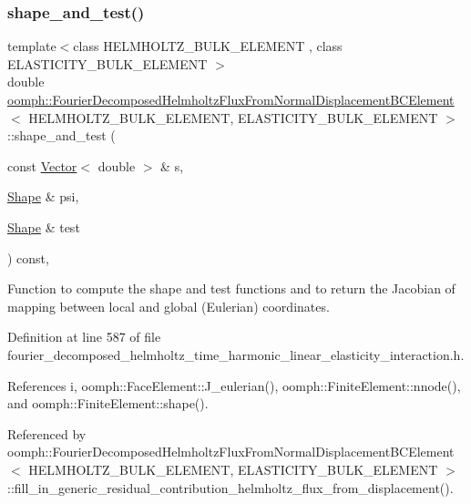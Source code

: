 \subsubsection{\texorpdfstring{shape\+\_\+and\+\_\+test()}{shape\_and\_test()}}
{\footnotesize\ttfamily template$<$class H\+E\+L\+M\+H\+O\+L\+T\+Z\+\_\+\+B\+U\+L\+K\+\_\+\+E\+L\+E\+M\+E\+NT , class E\+L\+A\+S\+T\+I\+C\+I\+T\+Y\+\_\+\+B\+U\+L\+K\+\_\+\+E\+L\+E\+M\+E\+NT $>$ \\
double \hyperlink{classoomph_1_1FourierDecomposedHelmholtzFluxFromNormalDisplacementBCElement}{oomph\+::\+Fourier\+Decomposed\+Helmholtz\+Flux\+From\+Normal\+Displacement\+B\+C\+Element}$<$ H\+E\+L\+M\+H\+O\+L\+T\+Z\+\_\+\+B\+U\+L\+K\+\_\+\+E\+L\+E\+M\+E\+NT, E\+L\+A\+S\+T\+I\+C\+I\+T\+Y\+\_\+\+B\+U\+L\+K\+\_\+\+E\+L\+E\+M\+E\+NT $>$\+::shape\+\_\+and\+\_\+test (\begin{DoxyParamCaption}\item[{const \hyperlink{classoomph_1_1Vector}{Vector}$<$ double $>$ \&}]{s,  }\item[{\hyperlink{classoomph_1_1Shape}{Shape} \&}]{psi,  }\item[{\hyperlink{classoomph_1_1Shape}{Shape} \&}]{test }\end{DoxyParamCaption}) const\hspace{0.3cm}{\ttfamily [inline]}, {\ttfamily [protected]}}



Function to compute the shape and test functions and to return the Jacobian of mapping between local and global (Eulerian) coordinates. 



Definition at line 587 of file fourier\+\_\+decomposed\+\_\+helmholtz\+\_\+time\+\_\+harmonic\+\_\+linear\+\_\+elasticity\+\_\+interaction.\+h.



References i, oomph\+::\+Face\+Element\+::\+J\+\_\+eulerian(), oomph\+::\+Finite\+Element\+::nnode(), and oomph\+::\+Finite\+Element\+::shape().



Referenced by oomph\+::\+Fourier\+Decomposed\+Helmholtz\+Flux\+From\+Normal\+Displacement\+B\+C\+Element$<$ H\+E\+L\+M\+H\+O\+L\+T\+Z\+\_\+\+B\+U\+L\+K\+\_\+\+E\+L\+E\+M\+E\+N\+T, E\+L\+A\+S\+T\+I\+C\+I\+T\+Y\+\_\+\+B\+U\+L\+K\+\_\+\+E\+L\+E\+M\+E\+N\+T $>$\+::fill\+\_\+in\+\_\+generic\+\_\+residual\+\_\+contribution\+\_\+helmholtz\+\_\+flux\+\_\+from\+\_\+displacement().

\mbox{\label{classoomph_1_1FourierDecomposedHelmholtzFluxFromNormalDisplacementBCElement_ab9f53637a61bc8a089170011596e5184}} 
